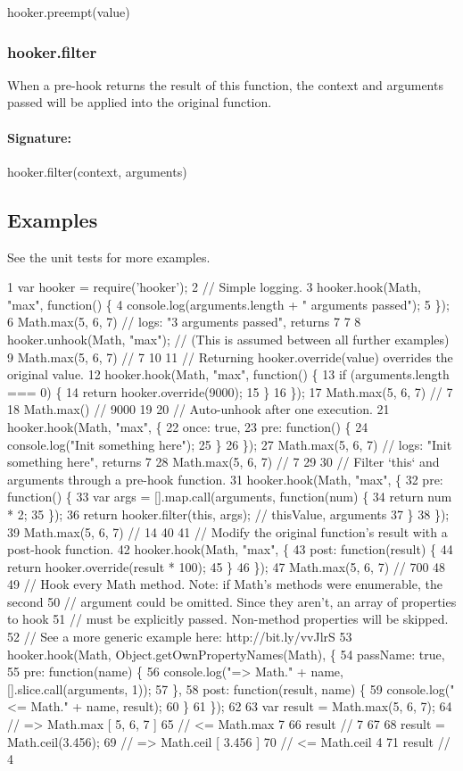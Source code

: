 {\ttfamily hooker.\+preempt(value)}

\subsubsection*{hooker.\+filter}

When a pre-\/hook returns the result of this function, the context and arguments passed will be applied into the original function. \paragraph*{Signature\+:}

{\ttfamily hooker.\+filter(context, arguments)}

\subsection*{Examples}

See the unit tests for more examples.


\begin{DoxyCode}
1 var hooker = require('hooker');
2 // Simple logging.
3 hooker.hook(Math, "max", function() \{
4   console.log(arguments.length + " arguments passed");
5 \});
6 Math.max(5, 6, 7) // logs: "3 arguments passed", returns 7
7 
8 hooker.unhook(Math, "max"); // (This is assumed between all further examples)
9 Math.max(5, 6, 7) // 7
10 
11 // Returning hooker.override(value) overrides the original value.
12 hooker.hook(Math, "max", function() \{
13   if (arguments.length === 0) \{
14     return hooker.override(9000);
15   \}
16 \});
17 Math.max(5, 6, 7) // 7
18 Math.max() // 9000
19 
20 // Auto-unhook after one execution.
21 hooker.hook(Math, "max", \{
22   once: true,
23   pre: function() \{
24     console.log("Init something here");
25   \}
26 \});
27 Math.max(5, 6, 7) // logs: "Init something here", returns 7
28 Math.max(5, 6, 7) // 7
29 
30 // Filter `this` and arguments through a pre-hook function.
31 hooker.hook(Math, "max", \{
32   pre: function() \{
33     var args = [].map.call(arguments, function(num) \{
34       return num * 2;
35     \});
36     return hooker.filter(this, args); // thisValue, arguments
37   \}
38 \});
39 Math.max(5, 6, 7) // 14
40 
41 // Modify the original function's result with a post-hook function.
42 hooker.hook(Math, "max", \{
43   post: function(result) \{
44     return hooker.override(result * 100);
45   \}
46 \});
47 Math.max(5, 6, 7) // 700
48 
49 // Hook every Math method. Note: if Math's methods were enumerable, the second
50 // argument could be omitted. Since they aren't, an array of properties to hook
51 // must be explicitly passed. Non-method properties will be skipped.
52 // See a more generic example here: http://bit.ly/vvJlrS
53 hooker.hook(Math, Object.getOwnPropertyNames(Math), \{
54   passName: true,
55   pre: function(name) \{
56     console.log("=> Math." + name, [].slice.call(arguments, 1));
57   \},
58   post: function(result, name) \{
59     console.log("<= Math." + name, result);
60   \}
61 \});
62 
63 var result = Math.max(5, 6, 7);
64 // => Math.max [ 5, 6, 7 ]
65 // <= Math.max 7
66 result // 7
67 
68 result = Math.ceil(3.456);
69 // => Math.ceil [ 3.456 ]
70 // <= Math.ceil 4
71 result // 4
\end{DoxyCode}


